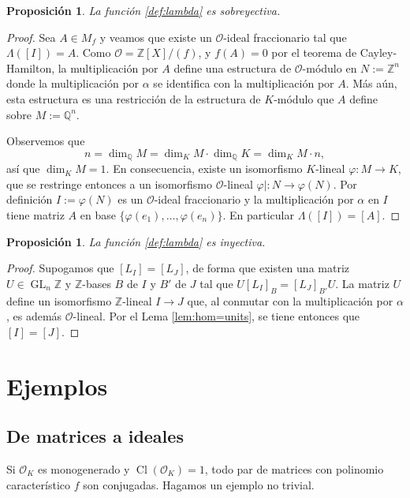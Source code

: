 \documentclass[11pt,a4paper]{amsart}
\newcommand{\Q}{\mathbb{Q}}
\newcommand{\Z}{\mathbb{Z}}
\DeclareMathOperator{\GL}{GL}
\DeclareMathOperator{\CL}{Cl}
\theoremstyle{plain}
\newtheorem{prop}[equation]{Proposición}
\renewcommand{\O}{\mathcal{O}}
\begin{document}
\begin{prop} La función \eqref{def:lambda} es sobreyectiva.
\end{prop}
\begin{proof} Sea $A \in M_f$ y veamos que existe un $\O$-ideal
fraccionario tal que $\Lambda([I]) = A$. Como $\O = \Z[X]/(f)$,
y $f(A) = 0$ por el teorema de Cayley-Hamilton,
la multiplicación por $A$ define una estructura de $\O$-módulo
en $N:= \Z^n$ donde la multiplicación por $\alpha$ se identifica con
la multiplicación por $A$. Más aún, esta estructura
es una restricción de la estructura
de $K$-módulo que $A$ define sobre $M := \Q^n$.

Observemos que
\[
n = \dim_{\Q} M = \dim_K M \cdot \dim_\Q K = \dim_K M \cdot n,
\]
así que $\dim_K M = 1$. En consecuencia, existe un isomorfismo
$K$-lineal $\varphi \colon M \to K$, que se restringe
entonces a un isomorfismo $\O$-lineal $\varphi| \colon N \to \varphi(N)$.
Por definición $I := \varphi(N)$ es un $\O$-ideal fraccionario y
la multiplicación por $\alpha$ en $I$ tiene matriz $A$ en base
$\{\varphi(e_1), \ldots, \varphi(e_n)\}$. En particular
$\Lambda([I]) = [A]$.
\end{proof}

\begin{prop} La función \eqref{def:lambda} es inyectiva.
\end{prop}
\begin{proof} Supogamos que $[L_I] = [L_J]$, de forma que existen
una matriz $U \in \GL_n \Z$ y $\Z$-bases $B$ de $I$ y $B'$ de $J$
tal que $U [L_I]_{B} = [L_J]_{B'} U$. La matriz $U$ define
un isomorfismo $\Z$-lineal $I \to J$ que, al conmutar con la multiplicación
por $\alpha$, es además $\O$-lineal. Por el Lema \ref{lem:hom=units},
se tiene entonces que $[I] = [J]$.
\end{proof}

\section{Ejemplos}

\subsection{De matrices a ideales} Si $\O_K$ es monogenerado
y $\CL(\O_K) = 1$, todo par de matrices con polinomio característico
$f$ son conjugadas. Hagamos un ejemplo no trivial.
\end{document}
